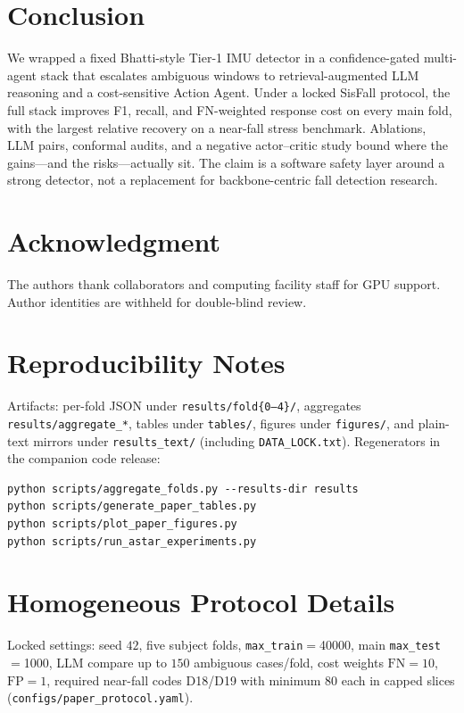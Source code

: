 \documentclass[journal]{IEEEtran}
\begin{document}
\section{Conclusion}
\label{sec:concl}

We wrapped a fixed Bhatti-style Tier-1 IMU detector in a confidence-gated multi-agent stack that escalates ambiguous windows to retrieval-augmented LLM reasoning and a cost-sensitive Action Agent. Under a locked SisFall protocol, the full stack improves F1, recall, and FN-weighted response cost on every main fold, with the largest relative recovery on a near-fall stress benchmark. Ablations, LLM pairs, conformal audits, and a negative actor--critic study bound where the gains---and the risks---actually sit. The claim is a software safety layer around a strong detector, not a replacement for backbone-centric fall detection research.

\section*{Acknowledgment}
The authors thank collaborators and computing facility staff for GPU support. Author identities are withheld for double-blind review.

\appendices
\section{Reproducibility Notes}
\label{app:repro}
Artifacts: per-fold JSON under \texttt{results/fold\{0--4\}/}, aggregates \texttt{results/aggregate\_*}, tables under \texttt{tables/}, figures under \texttt{figures/}, and plain-text mirrors under \texttt{results\_text/} (including \texttt{DATA\_LOCK.txt}). Regenerators in the companion code release:
\begin{verbatim}
python scripts/aggregate_folds.py --results-dir results
python scripts/generate_paper_tables.py
python scripts/plot_paper_figures.py
python scripts/run_astar_experiments.py
\end{verbatim}

\section{Homogeneous Protocol Details}
\label{app:protocol}
Locked settings: seed $42$, five subject folds, \texttt{max\_train}${}={}$40000, main \texttt{max\_test}${}={}$1000, LLM compare up to $150$ ambiguous cases/fold, cost weights $\mathrm{FN}{=}10$, $\mathrm{FP}{=}1$, required near-fall codes D18/D19 with minimum $80$ each in capped slices (\texttt{configs/paper\_protocol.yaml}).



\end{document}
